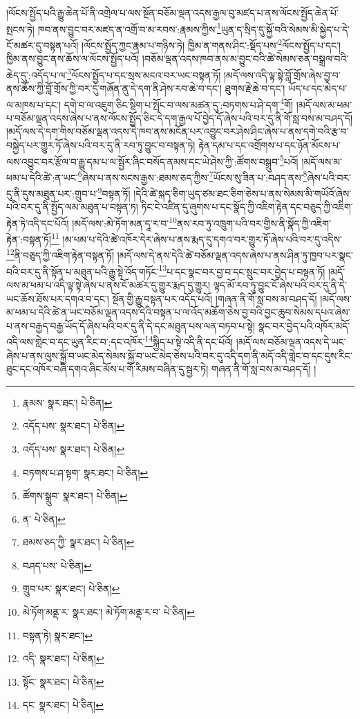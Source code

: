 །ལོངས་སྤྱོད་པའི་རྒྱུ་ཆེན་པོ་ནི་འགྲེལ་པ་ལས་སྔོན་བཅོམ་ལྡན་འདས་རྒྱལ་བུ་མཛད་པ་ནས་ལོངས་སྤྱོད་ཆེན་པོ་སྤངས་ཏེ། ཁབ་ནས་བྱུང་བར་མཛད་ན་འགྲོ་བ་མ་རབས་:རྣམས་ཀྱིས་\footnote{རྣམས་  སྣར་ཐང་།  པེ་ཅིན། }ཡུན་ད་སྲིད་དུ་སྐྱོ་བའི་སེམས་མི་སྐྱེད་པ་དེ་ངོ་མཚར་དུ་བསྟན་པའོ། །ལོངས་སྤྱོད་ཀྱང་རྣམ་པ་གཉིས་ཏེ། ཁྱིམ་ན་གནས་ཤིང་:སྡོད་པས་\footnote{འདོད་པས་  སྣར་ཐང་།  པེ་ཅིན། }ལོངས་སྤྱོད་པ་དང་། ཁྱིམ་ནས་བྱུང་ནས་ཆོས་ལ་ལོངས་སྤྱོད་པའོ། །བཅོམ་ལྡན་འདས་ཁབ་ནས་མ་བྱུང་བའི་ཚེ་སེམས་ཅན་བསྒྲལ་བའི་ཆེད་དུ་:འདོད་པ་ལ་\footnote{འདོད་པས་  སྣར་ཐང་།  པེ་ཅིན། }ལོངས་སྤྱོད་པ་དང་སྲས་མངའ་བར་ཡང་བསྟན་ཏོ། །མདོ་ལས་འདི་ལྟ་སྟེ་བློ་གྲོས་ཞེས་བྱ་བ་ནས་ཆོས་ཀྱི་བློ་གྲོས་ཀྱི་བར་དུ་གཞོན་ནུ་དེ་དག་ནི་ཤེས་རབ་ཆེ་བ་དང་། ཐུགས་རྗེ་ཆེ་བ་དང་། ཡོད་པ་དང་མེད་པ་ལ་མཁས་པ་དང་། དགེ་བ་ལ་འཇུག་ཅིང་སྡིག་པ་སྤོང་བ་ལས་མཚན་དུ་:བཏགས་པ་ཤེ་དག་\footnote{བཏགས་པ་ཤ་སྟག་  སྣར་ཐང་།  པེ་ཅིན། }གོ། །མདོ་ལས་མ་ཕམ་པ་བཅོམ་ལྡན་འདས་ཞེས་པ་ནས་ལོངས་སྤྱོད་ཅིང་དེ་དག་རྒྱལ་པོ་བྱེད་དོ་ཞེས་པའི་བར་དུ་ནི་གོ་སླ་བས་མ་བཤད་དོ། །མདོ་ལས་དེ་དག་གིས་བཅོམ་ལྡན་འདས་དེ་ཁབ་ནས་མངོན་པར་འབྱུང་བར་ཤེས་ཤིང་ཞེས་པ་ནས་དགེ་བའི་རྩ་བ་བསྐྱེད་པར་གྱུར་ཏོ་ཞེས་པའི་བར་དུ་ནི་རབ་ཏུ་བྱུང་བ་བསྟན་ཏེ། རྟེན་དམ་པ་དང་འགྲོགས་པ་དང་ཉོན་མོངས་པ་ལས་འབྱུང་བར་རྩོལ་བ་རྒྱུ་དམ་པ་ལ་སྦྱོར་ཞིང་བསོད་ནམས་དང་ཡེ་ཤེས་ཀྱི་:ཚོགས་བསྒྲུབ་\footnote{ཚོགས་སྒྲུབ་  སྣར་ཐང་།  པེ་ཅིན། }པའོ། །མདོ་ལས་མ་ཕམ་པ་དེའི་ཚེ་:ན་ཡང་\footnote{ན་  པེ་ཅིན། }ཞེས་པ་ནས་སངས་རྒྱས་:ཐམས་ཅད་ཀྱིས་\footnote{ཐམས་ཅད་ཀྱི་  སྣར་ཐང་།  པེ་ཅིན། }ཡོངས་སུ་ཟིན་པ་:བཤད་ནས་\footnote{བཤད་པས་  པེ་ཅིན། }ཞེས་པའི་བར་དུ་ནི་དུས་མཐུན་པར་:གྲུབ་པ་\footnote{གྲུབ་པར་  སྣར་ཐང་།  པེ་ཅིན། }བསྟན་ཏོ། །དེའི་ཚེ་སྐད་ཅིག་ཡུད་ཙམ་ཐང་ཅིག་ཅེས་པ་ནས་སེམས་མི་གཡོའོ་ཞེས་པའི་བར་དུ་ནི་སྤྱོད་ལམ་མཐུན་པ་བསྟན་ཏ། ཏིང་ངེ་འཛིན་དུ་ཞུགས་པ་དང་སྣོད་ཀྱི་འཇིག་རྟེན་དང་བཅུད་ཀྱི་འཇིག་རྟེན་ཏེ་འདི་དང་པོའོ། །མདོ་ལས་:མེ་ཏོག་མན་དཱ་ར་བ་\footnote{མེ་ཏོག་མནྡ་ར་  སྣར་ཐང་། མེ་ཏོག་མནྡ་ར་བ་  པེ་ཅིན། }ནས་རབ་ཏུ་འཁྲུག་པའི་བར་གྱིས་ནི་སྣོད་ཀྱི་འཇིག་རྟེན་:བསྟན་ཏོ།\footnote{བསྟན་ཏེ།  སྣར་ཐང་། } །མ་ཕམ་པ་དེའི་ཚེ་འཁོར་དེར་ཞེས་པ་ནས་རྨད་དུ་དགའ་བར་གྱུར་ཏོ་ཞེས་པའི་བར་དུ་འདིས་\footnote{འདི་  སྣར་ཐང་།  པེ་ཅིན། }ནི་བཅུད་ཀྱི་འཇིག་རྟེན་བསྟན་ཏོ། །མདོ་ལས་དེ་ནས་དེའི་ཚེ་བཅོམ་ལྡན་འདས་ཞེས་པ་ནས་ཤིན་ཏུ་ཁྱབ་པར་སྣང་བའི་བར་དུ་ནི་སྟོན་པ་མཐུན་པའི་རྒྱུ་སྟེ་འོད་གཏོང་\footnote{སྟོང་  སྣར་ཐང་།  པེ་ཅིན། }པ་དང་སྣང་བར་བྱ་བ་དང་སྲུང་བར་བྱེད་པ་བསྟན་ཏོ། །མདོ་ལས་མ་ཕམ་པ་འདི་ལྟ་སྟེ་ཞེས་པ་ནས་ངོ་མཚར་དུ་གྱུར་རྨད་དུ་གྱུར། ལྟད་མོ་རབ་ཏུ་བྱུང་ངོ་ཞེས་པའི་བར་དུ་ནི་དེ་ཡང་ཆོས་ཐོས་པར་དགའ་བ་དང་། སྔོན་གྱི་རྒྱུ་བསྟན་པར་འདོད་པའོ། །གཞན་ནི་གོ་སླ་བས་མ་བཤད་དོ། །མདོ་ལས་མ་ཕམ་པ་དེའི་ཚེ་ན་ཡང་བཅོམ་ལྡན་འདས་དེའི་བསྟན་པ་ལ་འོད་མཆོག་ཅེས་བྱ་བའི་བྱང་ཆུབ་སེམས་དཔའ་ཞེས་པ་ནས་བརྒྱད་བརྒྱ་ཡོད་དོ་ཞེས་པའི་བར་དུ་ནི་དེ་དང་མཐུན་པས་ལན་བཏབ་པ་སྟེ། སྣང་བར་བྱེད་པའི་འཁོར་མདོ་འདི་ལས་གླེང་བ་དང་ཡུན་རིང་བ་:དང་འཁོར་\footnote{དང་  སྣར་ཐང་།  པེ་ཅིན། }སྐྱིད་པ་སྟེ་འདི་ནི་དང་པོའོ། །མདོ་ལས་བཅོམ་ལྡན་འདས་དེ་ཡང་ཞེས་པ་ནས་ལུས་སྐྱོ་བ་ཡང་མེད་སེམས་སྐྱོ་བ་ཡང་མེད་ཅེས་པའི་བར་དུ་འདི་དག་ནི་མདོ་འདི་གླེང་བ་དང་དུས་རིང་ཐུང་དང་འཁོར་བཞི་དགའ་ཞིང་མོས་པ་གོ་རིམས་བཞིན་དུ་སྦྱར་ཏེ། གཞན་ནི་གོ་སླ་བས་མ་བཤད་དོ། །
